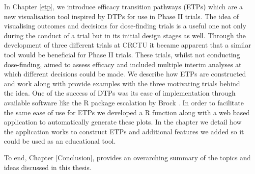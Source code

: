 In Chapter \ref{etp}, we introduce efficacy transition pathways (ETPs) which are a new visualisation tool inspired by DTPs for use in Phase \RN{2} trials. The idea of visualising outcomes and decisions for dose-finding trials is a useful one not only during the conduct of a trial but in its initial design stages as well. Through the development of three different trials at CRCTU it became apparent that a similar tool would be beneficial for Phase \RN{2} trials. These trials, whilst not conducting dose-finding, aimed to assess efficacy and included multiple interim analyses at which different decisions could be made. We describe how ETPs are constructed and work along with provide examples with the three motivating trials behind the idea. One of the success of DTPs was its ease of implementation through available software like the R package escalation by Brock \cite{brockModularApproachDose2020}. In order to facilitate the same ease of use for ETPs we developed a R function along with a web based application to automatically generate these plots. In the chapter we detail how the application works to construct ETPs and additional features we added so it could be used as an educational tool. 

To end, Chapter \ref{Conclusion}, provides an overarching summary of the topics and ideas discussed in this thesis. 




